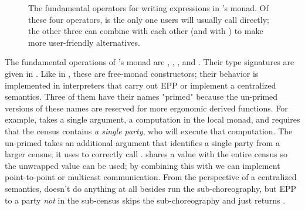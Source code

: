 \begin{figure*}[tbhp]
  \begin{mdframed}
    \inputminted[xleftmargin=10pt,linenos,fontsize=\scriptsize]{haskell}{figures/operators-multichor.hs.txt}
    \caption{
        The fundamental operators for writing expressions in \MultiChor's  monad.
        Of these four operators,  is the only one users will usually call directly;
        the other three can combine with each other (and with ) to make more user-friendly alternatives.
    }
    \label{fig:operators-multichor}
  \end{mdframed}
\end{figure*}

The fundamental operations of \MultiChor's  monad are
, , , and .
Their type signatures are given in .
Like in \HasChor, these are free-monad constructors; their behavior is implemented in interpreters
that carry out EPP or implement a centralized semantics.
Three of them have their names "primed" because the un-primed versions of these names are reserved for more ergonomic derived functions.
For example,  takes a single argument, a computation in the local monad, and requires that the census contains
\emph{a single party}, who will execute that computation.
The un-primed  takes an additional argument that identifies a single party from a larger census;
it uses  to correctly call .
 shares a  value with the entire census so the unwrapped value can be used;
by combining this with  we can implement point-to-point or multicast communication.
From the perspective of a centralized semantics,  doesn't do anything at all besides run
the sub-choreography,
but EPP to a party \emph{not} in the sub-census skips the sub-choreography and just returns .

